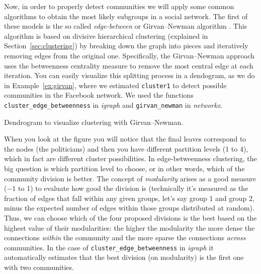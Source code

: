 
Now, in order to properly detect communities we will apply some common algorithms to obtain the most likely subgroups in a social network. The first of these models is the so called \emph{edge-between} or Girvan--Newman algorithm \citep{newman2004finding}. This algorithm is based on divisive hierarchical clustering (explained in Section~\ref{sec:clustering}) by breaking down the graph into pieces and iteratively removing edges from the original one. Specifically,  the Girvan--Newman approach uses the betweenness centrality measure to remove the most central edge at each iteration. You can easily visualize this splitting process in a dendogram, as we do in Example~\ref{ex:girvan}, where we estimated \texttt{cluster1} to detect possible communities in the Facebook network. We used the functions \texttt{cluster\_edge\_betweenness} in \emph{igraph} and \texttt{girvan\_newman} in \emph{networkx}.

\begin{ccsexample}
  \caption{Dendrogram to visualize clustering with Girvan--Newman.}
  \label{ex:girvan}
\end{ccsexample}



When you look at the figure you will notice that the final leaves correspond to the nodes (the politicians) and then you have different partition levels (1 to 4), which in fact are different cluster possibilities. In edge-betweenness clustering, the big question is which partition level to choose, or in other words, which of the community division is better. The concept of \emph{modularity} arises as a good measure ($-1$ to 1) to evaluate how good the division is (technically it's measured as the fraction of edges that fall within any given groups, let's say group 1 and group 2, minus the expected number of edges within those groups distributed at random). Thus, we can choose which of the four proposed divisions is the best based on the highest value of their modularities: the higher the modularity the more dense the connections \textit{within} the community and the more sparse the connections \textit{across} communities. In the case of \texttt{cluster\_edge\_betweenness} in \emph{igraph} it automatically estimates that the best division (on modularity) is the first one with two communities.

